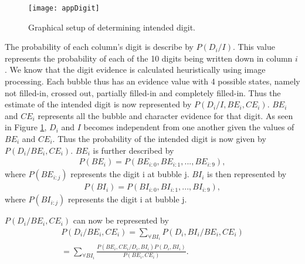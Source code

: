 \begin{figure}
  \centering
  \texttt{[image: appDigit]}\\
  \caption{Graphical setup of determining intended digit.}
  \label{fig:appDigit}
\end{figure}

The probability of each column's digit is describe by $P(D_i/I)$. This value represents the probability of each of the 10 digits being written down in column $i$ . We know that the digit evidence is calculated heuristically using image processing. Each bubble thus has an evidence value with 4 possible states, namely not filled-in, crossed out, partially filled-in and completely filled-in. Thus the estimate of the intended digit is now represented by $P(D_i/I,BE_i,CE_i)$. $BE_i$ and $CE_i$ represents all the bubble and character evidence for that digit. As seen in Figure \ref{fig:appDigit}, $D_i$ and $I$ becomes independent from one another given the values of $BE_i$ and $CE_i$. Thus the probability of the intended digit is now given by $P(D_i/BE_i,CE_i)$.
$BE_i$ is further described by 
\begin{align}
  P(BE_i) =  P(BE_{i:0},BE_{i:1},...,BE_{i:9}),
\label{eqn:ansIndep}
\end{align}
where  $P(BE_{i:j})$ represents the digit i at bubble j. $BI_i$ is then represented by
\begin{align}
  P(BI_i) =  P(BI_{i:0},BI_{i:1},...,BI_{i:9}),
\label{eqn:ansIndep}
\end{align}
where  $P(BI_{i:j})$ represents the digit i at bubble j.

$P(D_i/BE_i,CE_i)$ can now be represented by
\begin{align}
  P(D_i/BE_i,CE_i)	=  \sum_{\forall BI_i}^{}  P(D_i,BI_i/BE_i,CE_i)\\
  					=  \sum_{\forall BI_i}^{}  \frac{P(BE_i,CE_i/D_i,BI_i)P(D_i,BI_i)}{P(BE_i,CE_i)}.
\label{eqn:ansEqn2}
\end{align}

